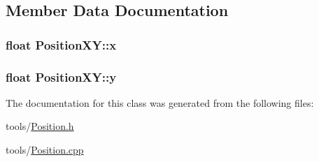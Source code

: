 \subsection{Member Data Documentation}
\hypertarget{class_position_x_y_a99d0a24e481bb0615157a08c1360dcec}{
\subsubsection[{x}]{\setlength{\rightskip}{0pt plus 5cm}float Position\+X\+Y\+::x\hspace{0.3cm}{\ttfamily [private]}}}\label{class_position_x_y_a99d0a24e481bb0615157a08c1360dcec}
\hypertarget{class_position_x_y_a16068e19060b1b47cee29398f2b26249}{
\subsubsection[{y}]{\setlength{\rightskip}{0pt plus 5cm}float Position\+X\+Y\+::y\hspace{0.3cm}{\ttfamily [private]}}}\label{class_position_x_y_a16068e19060b1b47cee29398f2b26249}


The documentation for this class was generated from the following files\+:\begin{DoxyCompactItemize}
\item 
tools/\hyperlink{_position_8h}{Position.\+h}\item 
tools/\hyperlink{_position_8cpp}{Position.\+cpp}\end{DoxyCompactItemize}
